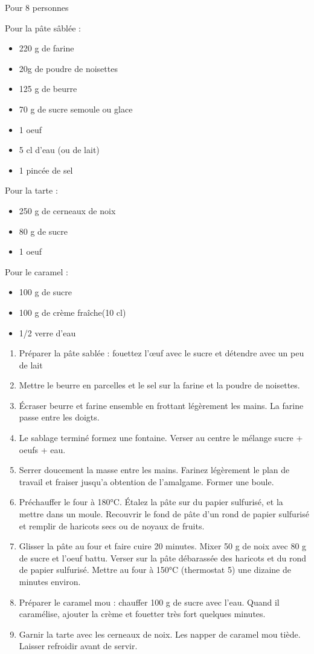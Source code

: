\bigskip
{}
{Pour 8 personnes}{Pour la pâte sâblée :
\begin{itemize}
	\item 220 g de farine 
	\item 20g de poudre de noisettes
	\item 125 g de beurre 
	\item 70 g de sucre semoule ou glace 
	\item 1 oeuf 
	\item 5 cl d'eau (ou de lait) 
	\item 1 pincée de sel 
\end{itemize}
Pour la tarte :
\begin{itemize}
	\item 250 g de cerneaux de noix
	\item 80 g de sucre
	\item 1 oeuf
\end{itemize}
Pour le caramel :
\begin{itemize}
	\item 100 g de sucre
	\item 100 g de crème fraîche(10 cl)
	\item 1/2 verre d'eau
\end{itemize}}
{\begin{enumerate}
	\item Préparer la pâte sablée : fouettez l'\oe uf avec le sucre et détendre avec un peu de lait
	\item Mettre le beurre en parcelles et le sel sur la farine et la poudre de noisettes.
	\item Écraser beurre et farine ensemble en frottant légèrement les mains. La farine passe entre les doigts.
	\item Le sablage terminé formez une fontaine. Verser au centre le mélange sucre + oeufs + eau.
	\item Serrer doucement la masse entre les mains. Farinez légèrement le plan de travail et fraiser jusqu'a obtention de l'amalgame. Former une boule.
	\item Préchauffer le four à 180°C. Étalez la pâte sur du papier sulfurisé, et la mettre dans un moule. Recouvrir le fond de pâte d'un rond de papier sulfurisé et remplir de haricots secs ou de noyaux de fruits. 
	\item Glisser la pâte au four et faire cuire 20 minutes. Mixer 50 g de noix avec 80 g de sucre et l'oeuf battu. Verser sur la pâte débarassée des haricots et du rond de papier sulfurisé. Mettre au four à 150°C (thermostat 5) une dizaine de minutes environ.
	\item Préparer le caramel mou : chauffer 100 g de sucre avec l'eau. Quand il caramélise, ajouter la crème et fouetter très fort quelques minutes.
	\item Garnir la tarte avec les cerneaux de noix. Les napper de caramel mou tiède. Laisser refroidir avant de servir.
\end{enumerate}}

